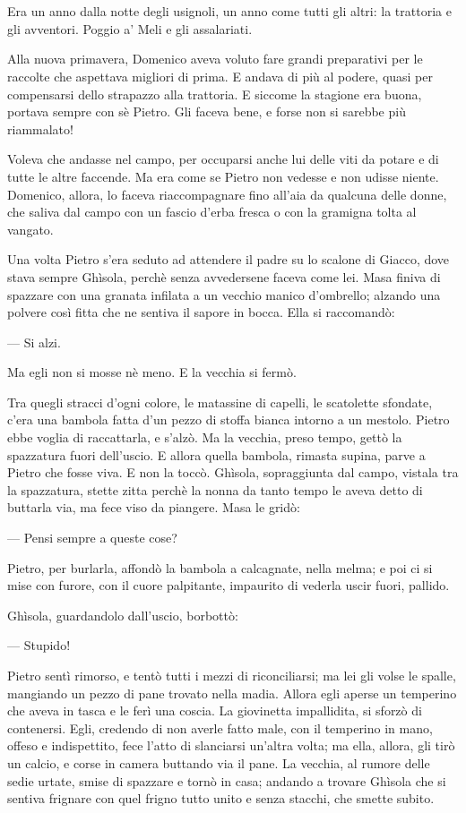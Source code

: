 \chapter{}

Era un anno dalla notte degli usignoli, un anno come tutti gli altri: la trattoria e gli avventori. Poggio a’ Meli e gli assalariati.

Alla nuova primavera, Domenico aveva voluto fare grandi preparativi per le raccolte che aspettava migliori di prima. E andava di più al podere, quasi per compensarsi dello strapazzo alla trattoria. E siccome la stagione era buona, portava sempre con sè Pietro. Gli faceva bene, e forse non si sarebbe più riammalato!

Voleva che andasse nel campo, per occuparsi anche lui delle viti da potare e di tutte le altre faccende. Ma era come se Pietro non vedesse e non udisse niente. Domenico, allora, lo faceva riaccompagnare fino all’aia da qualcuna delle donne, che saliva dal campo con un fascio d’erba fresca o con la gramigna tolta al vangato.

Una volta Pietro s’era seduto ad attendere il padre su lo scalone di Giacco, dove stava sempre Ghìsola, perchè senza avvedersene faceva come lei. Masa finiva di spazzare con una granata infilata a un vecchio manico d’ombrello; alzando una polvere così fitta che ne sentiva il sapore in bocca. Ella si raccomandò:

— Si alzi.

Ma egli non si mosse nè meno. E la vecchia si fermò.

Tra quegli stracci d’ogni colore, le matassine di capelli, le scatolette sfondate, c’era una bambola fatta d’un pezzo di stoffa bianca intorno a un mestolo. Pietro ebbe voglia di raccattarla, e s’alzò. Ma la vecchia, preso tempo, gettò la spazzatura fuori dell’uscio. E allora quella bambola, rimasta supina, parve a Pietro che fosse viva. E non la toccò. Ghìsola, sopraggiunta dal campo, vistala tra la spazzatura, stette zitta perchè la nonna da tanto tempo le aveva detto di buttarla via, ma fece viso da piangere. Masa le gridò:

— Pensi sempre a queste cose?

Pietro, per burlarla, affondò la bambola a calcagnate, nella melma; e poi ci si mise con furore, con il cuore palpitante, impaurito di vederla uscir fuori, pallido.

Ghìsola, guardandolo dall’uscio, borbottò:

— Stupido!

Pietro sentì rimorso, e tentò tutti i mezzi di riconciliarsi; ma lei gli volse le spalle, mangiando un pezzo di pane trovato nella madia. Allora egli aperse un temperino che aveva in tasca e le ferì una coscia. La giovinetta impallidita, si sforzò di contenersi. Egli, credendo di non averle fatto male, con il temperino in mano, offeso e indispettito, fece l’atto di slanciarsi un’altra volta; ma ella, allora, gli tirò un calcio, e corse in camera buttando via il pane. La vecchia, al rumore delle sedie urtate, smise di spazzare e tornò in casa; andando a trovare Ghìsola che si sentiva frignare con quel frigno tutto unito e senza stacchi, che smette subito.


